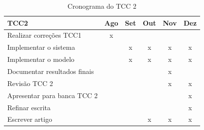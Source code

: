 \begin{table}[h]
	\centering
	\caption{Cronograma do TCC 2}
	\begin{tabular}{@{}lccccc@{}}
	\toprule
	TCC2                         & \multicolumn{1}{l}{Ago} & \multicolumn{1}{l}{Set} & \multicolumn{1}{l}{Out} & \multicolumn{1}{l}{Nov} & \multicolumn{1}{l}{Dez} \\ \midrule
	Realizar correções TCC1      & x                       &                         &                         &                         &                         \\
	Implementar o sistema        &                         & x                       & x                       & x                       & x                       \\
	Implementar o modelo         &                         & x                       & x                       & x                       & x                       \\
	Documentar resultados finais &                         &                         &                         & x                       &                         \\
	Revisão TCC 2                &                         &                         &                         & x                       & x                       \\
	Apresentar para banca TCC 2  &                         &                         &                         &                         & x                       \\
	Refinar escrita              &                         &                         &                         &                         & x                       \\
	Escrever artigo              &                         &                         & x                       & x                       & x                       \\ \bottomrule
	\end{tabular}
	\label{table:CronogramaTCC2}
	\end{table}
